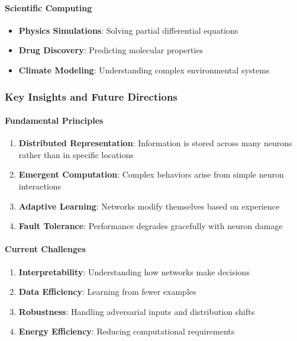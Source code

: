 \paragraph{Scientific Computing}

\begin{itemize}
\item \textbf{Physics Simulations}: Solving partial differential equations
\item \textbf{Drug Discovery}: Predicting molecular properties
\item \textbf{Climate Modeling}: Understanding complex environmental systems
\end{itemize}

\subsubsection{Key Insights and Future Directions}

\paragraph{Fundamental Principles}

\begin{enumerate}
\item \textbf{Distributed Representation}: Information is stored across many neurons rather than in specific locations
\item \textbf{Emergent Computation}: Complex behaviors arise from simple neuron interactions
\item \textbf{Adaptive Learning}: Networks modify themselves based on experience
\item \textbf{Fault Tolerance}: Performance degrades gracefully with neuron damage
\end{enumerate}

\paragraph{Current Challenges}

\begin{enumerate}
\item \textbf{Interpretability}: Understanding how networks make decisions
\item \textbf{Data Efficiency}: Learning from fewer examples
\item \textbf{Robustness}: Handling adversarial inputs and distribution shifts
\item \textbf{Energy Efficiency}: Reducing computational requirements
\end{enumerate}

